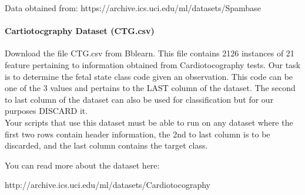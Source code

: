 \documentclass[12pt]{article}
\begin{document}
\noindent
Data obtained from:  https://archive.ics.uci.edu/ml/datasets/Spambase

\paragraph{Cartiotocgraphy Dataset  (CTG.csv)}

Download the file CTG.csv from Bblearn. This file contains 2126 instances of 21 feature pertaining to information obtained from Cardiotocography tests. Our task is to determine the fetal state class code given an observation. This code can be one of the 3 values and pertains to the LAST column of the dataset. The second to last column of the dataset can also be used for classification but for our purposes DISCARD it.\\

\noindent
Your scripts that use this dataset must be able to run on any dataset where the first two rows contain header information, the 2nd to last column is to be discarded, and the last column contains the target class.

\noindent
You can read more about the dataset here:
\begin{center}
http://archive.ics.uci.edu/ml/datasets/Cardiotocography
\end{center}
\newpage
\end{document}
